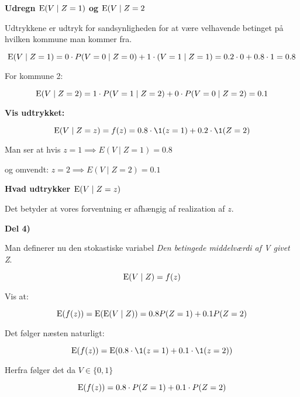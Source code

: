 \textbf{Udregn $\text{E}(V \mid Z=1)$ og $\text{E}(V \mid Z =2$}

Udtrykkene er udtryk for sandsynligheden for at være velhavende betinget på hvilken kommune man kommer fra.

\begin{equation}
    \text{E}(V \mid Z=1) =  0 \cdot P(V=0 \mid Z = 0) + 1 \cdot (V=1 \mid Z=1) = 0.2 \cdot 0 + 0.8 \cdot 1 = 0.8
\end{equation}

For kommune 2:

\begin{equation}
    \text{E}(V \mid Z = 2) = 1 \cdot P(V=1 \mid Z=2) +  0\cdot  P(V=0 \mid Z=2) = 0.1 
\end{equation}

\textbf{Vis udtrykket:}

\begin{equation}
    \E(V \mid Z=z) = f(z) = 0.8 \cdot \1(z=1) + 0.2 \cdot \1(Z=2)
\end{equation}

Man ser at hvis $z=1 \implies E(V \mid Z=1) = 0.8$

og omvendt: $z=2 \implies E(V \mid Z=2) = 0.1$

\textbf{Hvad udtrykker $\text{E}(V \mid Z=z)$}

Det betyder at vores forventning er afhængig af realization af $z$.

\textbf{Del 4) }

Man definerer nu den stokastiske variabel \textit{Den betingede middelværdi af V givet Z}.

\begin{equation}
    \text{E}(V \mid Z) = f(z)
\end{equation}

Vis at:

\begin{equation}
    \text{E}(f(z)) = \text{E}(\text{E}(V \mid Z)) = 0.8 P(Z=1) + 0.1 P(Z=2)
\end{equation}

Det følger næsten naturligt:

\begin{equation}
    \E(f(z)) = \E(0.8 \cdot \1(z=1) + 0.1 \cdot \1(z=2))
\end{equation}

Herfra følger det da $V\in \{0,1\}$

\begin{equation}
    \text{E}(f(z)) = 0.8 \cdot P(Z=1) + 0.1 \cdot P(Z=2)
\end{equation}

